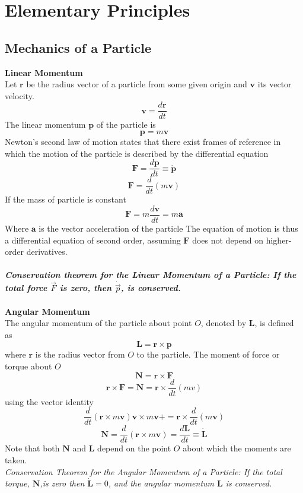 \chapter{Elementary Principles}
\section{Mechanics of a Particle}
\textbf{Linear Momentum}\\
Let $\textbf{r}$ be the radius vector of a particle from some given origin and $\textbf{v}$ its vector velocity.
$$\textbf{v}=\frac{d\textbf{r}}{dt}$$
The linear momentum $\textbf{p}$ of the particle is 
$$\textbf{p}=m\textbf{v}$$
Newton's second law of motion  states that there exist frames of reference in which the motion of the particle is described by the differential equation
$$\textbf{F}=\frac{d\textbf{p}}{dt}\equiv\dot{\textbf{p}}$$
$$\textbf{F}=\frac{d}{dt}(m\textbf{v})$$
If the mass of particle is constant
$$\textbf{F}=m\frac{d\textbf{v}}{dt}=m\textbf{a}$$
Where $\textbf{a}$ is the vector acceleration of the particle
The equation of motion is thus a differential equation of second order, assuming $\textbf{F}$ does not depend on higher-order derivatives.\\\\
\textbf{\textit{Conservation theorem for the Linear Momentum of a Particle: If the total force $\vec{F}$ is zero, then $\dot{\vec{p}}$, is conserved.}}\vspace{0.5cm}
\\\\
\textbf{Angular Momentum}\vspace{0.2cm}\\
The angular momentum of the particle about point $O$, denoted by $\textbf{L}$, is defined as
$$\textbf{L}=\textbf{r}\times\textbf{p}$$
where $\textbf{r}$ is the radius vector from $O$ to the particle. The moment of force or torque about $O$ 
 $$\textbf{N}=\textbf{r}\times\textbf{F}$$
 $$\textbf{r}\times\textbf{F}=\textbf{N}=\textbf{r}\times\frac{d}{dt}(mv)$$
 using the vector identity
 $$\frac{d}{dt}(\textbf{r}\times m\textbf{v})\textbf{v}\times m\textbf{v}+=\textbf{r}\times\frac{d}{dt}(m\textbf{v})$$
$$\textbf{N}=\frac{d}{dt}(\textbf{r}\times m\textbf{v})=\frac{d\textbf{L}}{dt}\equiv \dot{\textbf{L}}$$
Note that both $\textbf{N}$ and $\textbf{L}$ depend on the point $O$ about which the moments are taken.\\
\textit{Conservation Theorem for the Angular Momentum of a Particle: If the total torque, $\textbf{N}$,is zero then $\dot{\textbf{L}}=0$, and the angular momentum $\textbf{L}$ is conserved. }\\\\
